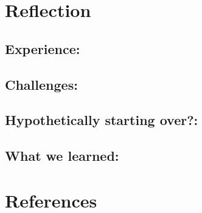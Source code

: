 \documentclass[11pt]{article}
\begin{document}
\section*{Reflection}

\subsection*{Experience:}

\subsection*{Challenges:}

\subsection*{Hypothetically starting over?:}

\subsection*{What we learned:}

\section*{References}
\end{document}
